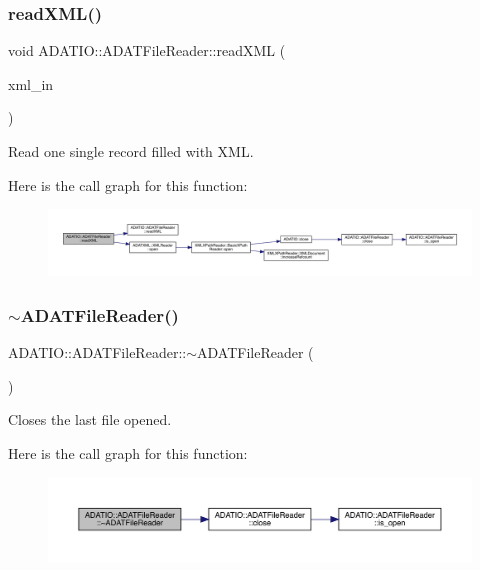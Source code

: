 \subsubsection{\texorpdfstring{readXML()}{readXML()}\hspace{0.1cm}{\footnotesize\ttfamily [2/2]}}
{\footnotesize\ttfamily void A\+D\+A\+T\+I\+O\+::\+A\+D\+A\+T\+File\+Reader\+::read\+X\+ML (\begin{DoxyParamCaption}\item[{\mbox{\hyperlink{classADATXML_1_1XMLReader}{X\+M\+L\+Reader}} \&}]{xml\+\_\+in }\end{DoxyParamCaption})\hspace{0.3cm}{\ttfamily [protected]}}



Read one single record filled with X\+ML. 

Here is the call graph for this function\+:\nopagebreak
\begin{figure}[H]
\begin{center}
\leavevmode
\includegraphics[width=350pt]{db/de5/group__qio_ga9a1ac411577bd50e643f483119318893_cgraph}
\end{center}
\end{figure}
\mbox{\label{group__qio_ga54a5eea68d2a1c6f5b748f6ba75b7d22}} 
\subsubsection{\texorpdfstring{$\sim$ADATFileReader()}{~ADATFileReader()}}
{\footnotesize\ttfamily A\+D\+A\+T\+I\+O\+::\+A\+D\+A\+T\+File\+Reader\+::$\sim$\+A\+D\+A\+T\+File\+Reader (\begin{DoxyParamCaption}{ }\end{DoxyParamCaption})}



Closes the last file opened. 

Here is the call graph for this function\+:\nopagebreak
\begin{figure}[H]
\begin{center}
\leavevmode
\includegraphics[width=350pt]{db/de5/group__qio_ga54a5eea68d2a1c6f5b748f6ba75b7d22_cgraph}
\end{center}
\end{figure}


